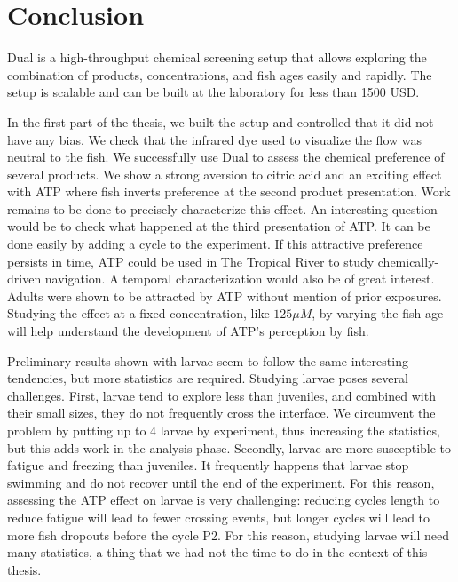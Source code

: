   \chapter{Conclusion}
  Dual is a high-throughput chemical screening setup that allows exploring the combination of products, concentrations, and fish ages easily and rapidly. The setup is scalable and can be built at the laboratory for less than 1500 USD.

  In the first part of the thesis, we built the setup and controlled that it did not have any bias. We check that the infrared dye used to visualize the flow was neutral to the fish. We successfully use Dual to assess the chemical preference of several products. We show a strong aversion to citric acid and an exciting effect with ATP where fish inverts preference at the second product presentation. Work remains to be done to precisely characterize this effect. An interesting question would be to check what happened at the third presentation of ATP. It can be done easily by adding a cycle to the experiment. If this attractive preference persists in time, ATP could be used in The Tropical River to study chemically-driven navigation. A temporal characterization would also be of great interest. Adults were shown to be attracted by ATP without mention of prior exposures. Studying the effect at a fixed concentration, like $125 \mu M$, by varying the fish age will help understand the development of ATP's perception by fish.

  Preliminary results shown with larvae seem to follow the same interesting tendencies, but more statistics are required. Studying larvae poses several challenges. First, larvae tend to explore less than juveniles, and combined with their small sizes, they do not frequently cross the interface. We circumvent the problem by putting up to 4 larvae by experiment, thus increasing the statistics, but this adds work in the analysis phase. Secondly, larvae are more susceptible to fatigue and freezing than juveniles. It frequently happens that larvae stop swimming and do not recover until the end of the experiment. For this reason, assessing the ATP effect on larvae is very challenging: reducing cycles length to reduce fatigue will lead to fewer crossing events, but longer cycles will lead to more fish dropouts before the cycle P2. For this reason, studying larvae will need many statistics, a thing that we had not the time to do in the context of this thesis.

